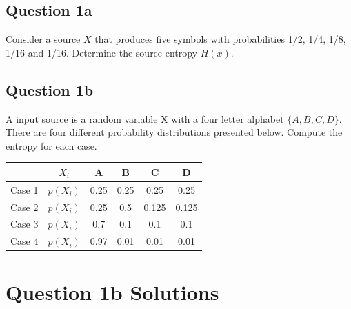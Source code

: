 \documentclass[a4paper,12pt]{article}
\begin{document}
\newpage
{}

\subsection*{Question 1a}
Consider a source $X$ that produces five symbols with probabilities 1/2, 1/4, 1/8, 1/16 and 1/16. Determine the source entropy $H(x)$. 

\subsection*{Question 1b}

A input source is a random variable X with a four letter alphabet $\{A,B,C,D\}$.
There are four different probability distributions presented below. Compute the entropy for each case.
\begin{center}
\begin{tabular}{|c|c|c|c|c|c|}
\hline	&	$X_i$	&	A	&	B	&	C	&	D	\\ \hline
Case 1	&	$p(X_i)$	&	0.25	&	0.25	&	0.25	&	0.25	\\ \hline
Case 2	&	$p(X_i)$	&	0.25	&	0.5	&	0.125	&	0.125	\\ \hline
Case 3	&	$p(X_i)$	&	0.7	&	0.1	&	0.1	&	0.1	\\ \hline
Case 4	&	$p(X_i)$	&	0.97	&	0.01	&	0.01	&	0.01	\\ \hline
\end{tabular} 
\end{center}



\section*{Question 1b Solutions}
\end{document}
